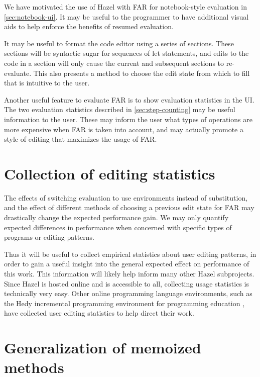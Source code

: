 We have motivated the use of Hazel with FAR for notebook-style evaluation in \cref{sec:notebook-ui}. It may be useful to the programmer to have additional visual aids to help enforce the benefits of resumed evaluation.

It may be useful to format the code editor using a series of sections. These sections will be syntactic sugar for sequences of let statements, and edits to the code in a section will only cause the current and subsequent sections to re-evaluate. This also presents a method to choose the edit state from which to fill that is intuitive to the user.

Another useful feature to evaluate FAR is to show evaluation statistics in the UI. The two evaluation statistics described in \cref{sec:step-counting} may be useful information to the user. These may inform the user what types of operations are more expensive when FAR is taken into account, and may actually promote a style of editing that maximizes the usage of FAR.

\section{Collection of editing statistics}
\label{sec:collect-edit-statistics}

The effects of switching evaluation to use environments instead of substitution, and the effect of different methods of choosing a previous edit state for FAR may drastically change the expected performance gain. We may only quantify expected differences in performance when concerned with specific types of programs or editing patterns.

Thus it will be useful to collect empirical statistics about user editing patterns, in order to gain a useful insight into the general expected effect on performance of this work. This information will likely help inform many other Hazel subprojects. Since Hazel is hosted online and is accessible to all, collecting usage statistics is technically very easy. Other online programming language environments, such as the Hedy incremental programming environment for programming education \cite{hermans2020hedy,gilsing2021gradual}, have collected user editing statistics to help direct their work.

\section{Generalization of memoized methods}
\label{sec:generalized-memoization}


